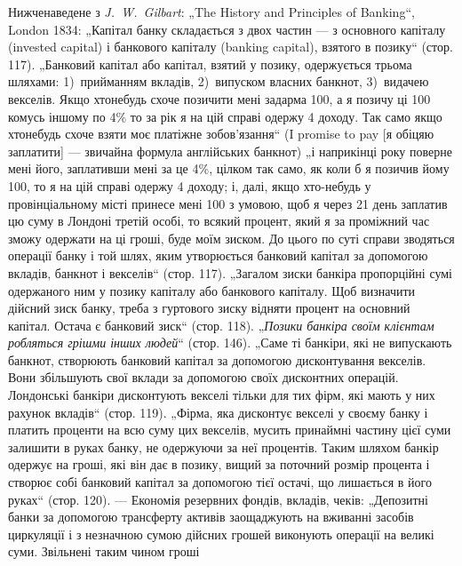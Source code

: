 Нижченаведене з \emph{J.~W.~Gilbart}: „The History and Principles of Banking“,
London 1834: „Капітал банку складається з двох частин — з основного капіталу
(invested capital) і банкового капіталу (banking capital), взятого в позику“ (стор. 117).
„Банковий капітал або капітал, взятий у позику, одержується трьома шляхами:
1)~прийманням вкладів, 2)~випуском власних банкнот, 3)~видачею векселів. Якщо
хтонебудь схоче позичити мені задарма 100, а я позичу ці
100 комусь іншому по 4\% то за рік я на цій справі одержу
4 доходу. Так само якщо хтонебудь схоче взяти моє платіжне
зобов’язання“ (I promise to pay [я обіцяю заплатити] — звичайна формула англійських банкнот) „і
наприкінці року поверне мені його, заплативши мені за це 4\%, цілком так само, як коли б я позичив
йому 100, то я на цій справі одержу 4 доходу; і, далі, якщо
хто-небудь у провінціальному місті принесе мені 100 з умовою, щоб я через 21 день
заплатив цю суму в Лондоні третій особі, то всякий процент, який я за проміжний час зможу одержати
на ці гроші, буде моїм зиском. До цього по суті справи зводяться операції банку і той шлях, яким
утворюється банковий капітал за допомогою вкладів, банкнот і векселів“ (стор. 117). „Загалом зиски
банкіра пропорційні сумі одержаного ним у позику капіталу або банкового капіталу. Щоб визначити
дійсний зиск банку, треба з гуртового зиску відняти процент на основний капітал. Остача є банковий
зиск“ (стор. 118). „\emph{Позики банкіра своїм клієнтам робляться грішми інших людей}“ (стор. 146). „Саме
ті банкіри, які не випускають банкнот, створюють банковий капітал за допомогою дисконтування
векселів. Вони збільшують свої вклади за допомогою своїх дисконтних операцій. Лондонські банкіри
дисконтують векселі тільки для тих фірм, які мають у них рахунок вкладів“ (стор. 119). „Фірма, яка
дисконтує векселі у своєму банку і платить проценти на всю суму цих векселів, мусить принаймні
частину цієї суми залишити
в руках банку, не одержуючи за неї процентів. Таким шляхом банкір одержує на гроші, які він дає в
позику, вищий за поточний розмір процента і
створює собі банковий капітал за допомогою тієї остачі, що лишається в його руках“ (стор. 120). —
Економія резервних фондів, вкладів, чеків: „Депозитні банки за
допомогою трансферту активів заощаджують на вживанні засобів циркуляції і з
незначною сумою дійсних грошей виконують операції на великі суми. Звільнені таким чином гроші
